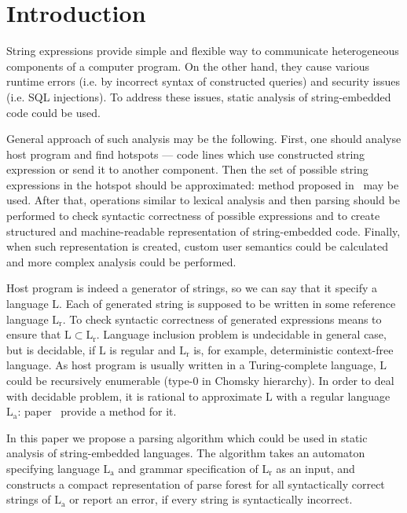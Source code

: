 \documentclass{llncs}
\begin{document}
\section{Introduction}
String expressions provide simple and flexible way to communicate heterogeneous 
components of a computer program. On the other hand, they cause various runtime 
errors (i.e. by incorrect syntax of constructed queries) and security issues 
(i.e. SQL injections). To address these issues, static analysis of string-embedded 
code could be used. 

General approach of such analysis may be the following. First, one should analyse 
host program and find hotspots — code lines which use constructed string expression 
or send it to another component. Then the set of possible string expressions in 
the hotspot should be approximated: method proposed in~\cite{Stranger} may be used. After that, 
operations similar to lexical analysis and then parsing should be performed to check 
syntactic correctness of possible expressions and to create structured and 
machine-readable representation of string-embedded code. Finally, when such 
representation is created, custom user semantics could be calculated and more 
complex analysis could be performed. 

Host program is indeed a generator of strings, so we can say that it specify a 
language $\mathrm{L}$. Each of generated string is supposed to be written in some 
reference language $\mathrm{L_r}$. To check syntactic correctness of generated 
expressions means to ensure that $\mathrm{L} \subset \mathrm{L_r}$. Language 
inclusion problem is undecidable in general case, but is decidable, if $\mathrm{L}$ 
is regular and $\mathrm{L_r}$ is, for example, deterministic context-free language. 
As host program is usually written in a Turing-complete language, $\mathrm{L}$ 
could be recursively enumerable (type-0 in Chomsky hierarchy). In order to deal 
with decidable problem, it is rational to approximate $\mathrm{L}$ with a regular 
language $\mathrm{L_a}$: paper~\cite{Stranger}  provide a method for it. 

In this paper we propose a parsing algorithm which could be used in static analysis 
of string-embedded languages. The algorithm takes an automaton specifying language 
$\mathrm{L_a}$ and grammar specification of $\mathrm{L_r}$ as an input, and constructs 
a compact representation of parse forest for all syntactically correct strings of 
$\mathrm{L_a}$ or report an error, if every string is syntactically incorrect. 
\end{document}
